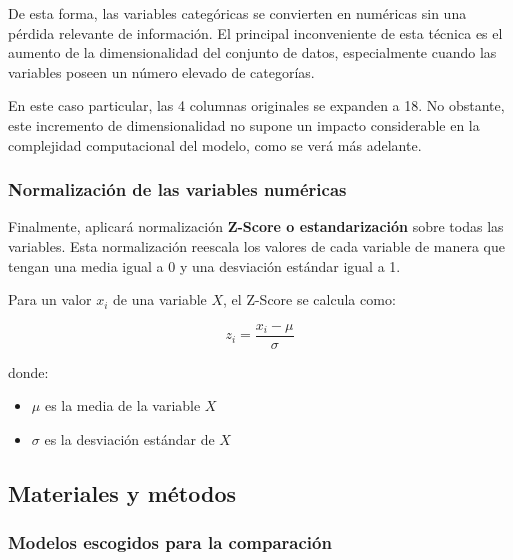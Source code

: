 De esta forma, las variables categóricas se convierten en numéricas sin una pérdida relevante de información. El principal inconveniente de esta técnica es el aumento de la dimensionalidad del conjunto de datos, especialmente cuando las variables poseen un número elevado de categorías.

En este caso particular, las 4 columnas originales se expanden a 18. No obstante, este incremento de dimensionalidad no supone un impacto considerable en la complejidad computacional del modelo, como se verá más adelante.


\subsubsection{Normalización de las variables numéricas}

Finalmente, aplicará normalización \textbf{Z-Score o estandarización} sobre todas las variables. Esta normalización reescala los valores de cada variable de manera que tengan una media igual a 0 y una desviación estándar igual a 1. 

Para un valor $x_i$ de una variable $X$, el Z-Score se calcula como:

$$
z_i = \frac{x_i-\mu}{\sigma}
$$

donde:
\begin{itemize}
    \item $\mu$ es la media de la variable $X$
    \item $\sigma$ es la desviación estándar de $X$
\end{itemize}


\subsection{Materiales y métodos}

\subsubsection{Modelos escogidos para la comparación}

